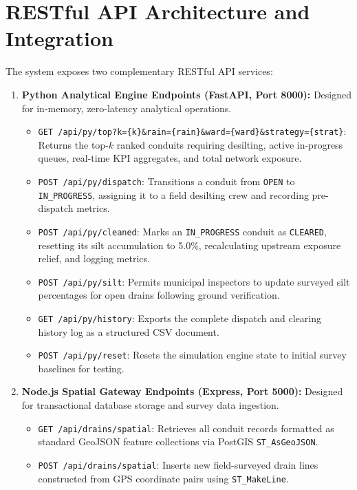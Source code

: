 \section{RESTful API Architecture and Integration}
The system exposes two complementary RESTful API services:
\begin{enumerate}
    \item \textbf{Python Analytical Engine Endpoints (FastAPI, Port 8000):} Designed for in-memory, zero-latency analytical operations.
    \begin{itemize}
        \item \texttt{GET /api/py/top?k=\{k\}\&rain=\{rain\}\&ward=\{ward\}\&strategy=\{strat\}}: Returns the top-$k$ ranked conduits requiring desilting, active in-progress queues, real-time KPI aggregates, and total network exposure.
        \item \texttt{POST /api/py/dispatch}: Transitions a conduit from \texttt{OPEN} to \texttt{IN\_PROGRESS}, assigning it to a field desilting crew and recording pre-dispatch metrics.
        \item \texttt{POST /api/py/cleaned}: Marks an \texttt{IN\_PROGRESS} conduit as \texttt{CLEARED}, resetting its silt accumulation to 5.0\%, recalculating upstream exposure relief, and logging metrics.
        \item \texttt{POST /api/py/silt}: Permits municipal inspectors to update surveyed silt percentages for open drains following ground verification.
        \item \texttt{GET /api/py/history}: Exports the complete dispatch and clearing history log as a structured CSV document.
        \item \texttt{POST /api/py/reset}: Resets the simulation engine state to initial survey baselines for testing.
    \end{itemize}
    \item \textbf{Node.js Spatial Gateway Endpoints (Express, Port 5000):} Designed for transactional database storage and survey data ingestion.
    \begin{itemize}
        \item \texttt{GET /api/drains/spatial}: Retrieves all conduit records formatted as standard GeoJSON feature collections via PostGIS \texttt{ST\_AsGeoJSON}.
        \item \texttt{POST /api/drains/spatial}: Inserts new field-surveyed drain lines constructed from GPS coordinate pairs using \texttt{ST\_MakeLine}.
    \end{itemize}
\end{enumerate}

